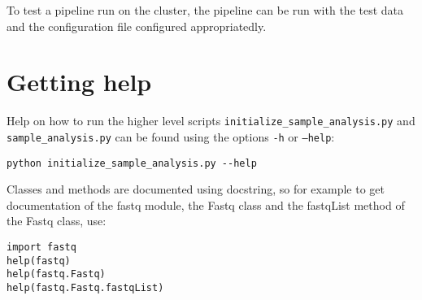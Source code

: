 \documentclass[a4paper]{article}
\begin{document}
To test a pipeline run on the cluster, the pipeline can be run with
the test data and the configuration file configured appropriatedly.
  


\section{Getting help}
\label{sec:getting-help}


Help on how to run the higher level
scripts \texttt{initialize\_sample\_analysis.py} and
\texttt{sample\_analysis.py} can be found using the options
\texttt{-h} or \texttt{--help}:

\begin{verbatim}
python initialize_sample_analysis.py --help
\end{verbatim}

Classes and methods are documented using docstring, so for example to
get documentation of the fastq module, the Fastq class and the
fastqList method of the Fastq class, use:

\begin{verbatim}
import fastq
help(fastq)
help(fastq.Fastq)
help(fastq.Fastq.fastqList)
\end{verbatim}



\printbibliography
\end{document}
